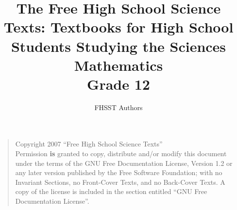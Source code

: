 \documentclass[9pt,a4paper,titlepage,twoside,openright]{extbook}
\begin{document}
\title{The Free High School Science Texts: Textbooks for High School Students Studying the Sciences\\
\textbf{Mathematics}\\
Grade 12}
\author{FHSST Authors}
\maketitle
\cleardoublepage
\begin{quote}
Copyright 2007 ``Free High School Science Texts''\\
Permission \textbf{is} granted to copy, distribute and/or modify this document under the terms of the GNU Free Documentation License, Version 1.2 or any later version published by the Free Software Foundation; with no Invariant Sections, no Front-Cover Texts, and no Back-Cover Texts.
A copy of the license is included in the section entitled ``GNU Free Documentation License''.
\end{quote}
\end{document}
